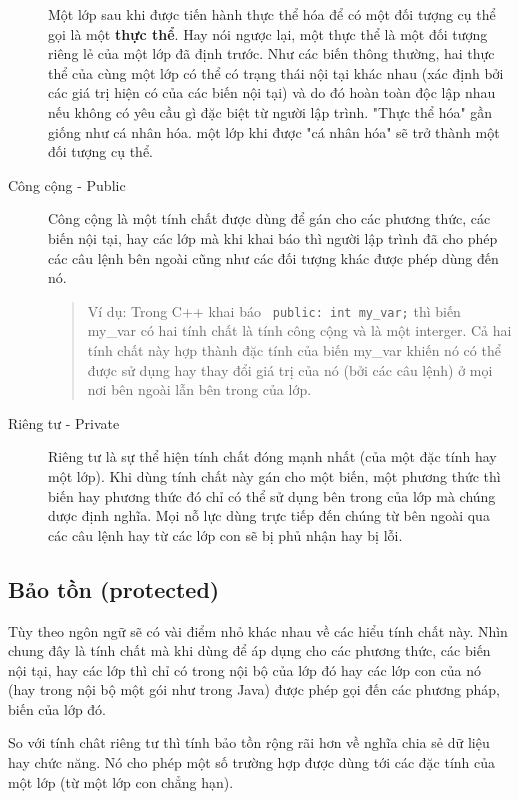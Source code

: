 \documentclass[10pt, a4paper]{article}
\begin{document}
\begin{description}
Một lớp sau khi được tiến hành thực thể hóa để có một đối tượng cụ thể gọi là một \textbf{thực thể}. Hay nói ngược lại, một thực thể là một đối tượng riêng lẻ của một lớp đã định trước. Như các biến thông thường, hai thực thể của cùng một lớp có thể có trạng thái nội tại khác nhau (xác định bởi các giá trị hiện có của các biến nội tại) và do đó hoàn toàn độc lập nhau nếu không có yêu cầu gì đặc biệt từ người lập trình. "Thực thể hóa" gần giống như cá nhân hóa. một lớp khi được "cá nhân hóa" sẽ trở thành một đối tượng cụ thể.
\item[Công cộng - Public] Công cộng là một tính chất được dùng để gán cho các phương thức, các biến nội tại, hay các lớp mà khi khai báo thì người lập trình đã cho phép các câu lệnh bên ngoài cũng như các đối tượng khác được phép dùng đến nó. 
\begin{quotation}
Ví dụ: Trong C++ khai báo \verb$ public: int my_var;$ thì biến \textsf{my\_var} có hai tính chất là tính công cộng và là một interger. Cả hai tính chất này hợp thành đặc tính của biến \textsf{my\_var} khiến nó có thể được sử dụng hay thay đổi giá trị của nó (bởi các câu lệnh) ở mọi nơi bên ngoài lẫn bên trong của lớp.
\end{quotation}
\item[Riêng tư - Private] Riêng tư là sự thể hiện tính chất đóng mạnh nhất (của một đặc tính hay một lớp). Khi dùng tính chất này gán cho một biến, một phương thức thì biến hay phương thức đó chỉ có thể sử dụng bên trong của lớp mà chúng dược định nghĩa. Mọi nỗ lực dùng trực tiếp đến chúng từ bên ngoài qua các câu lệnh hay từ các lớp con sẽ bị phủ nhận hay bị lỗi.


\end{description}

\subsection{Bảo tồn (protected)}
Tùy theo ngôn ngữ sẽ có vài điểm nhỏ khác nhau về các hiểu tính chất này. Nhìn chung đây là tính chất mà khi dùng để áp dụng cho các phương thức, các biến nội tại, hay các lớp thì chỉ có trong nội bộ của lớp đó hay các lớp con của nó (hay trong nội bộ một gói như trong Java) được phép gọi đến các phương pháp, biến của lớp đó. 

So với tính chât riêng tư thì tính bảo tồn rộng rãi hơn về nghĩa chia sẻ dữ liệu hay chức năng. Nó cho phép một số trường hợp được dùng tới các đặc tính của một lớp (từ một lớp con chẳng hạn).\\
\end{document}
